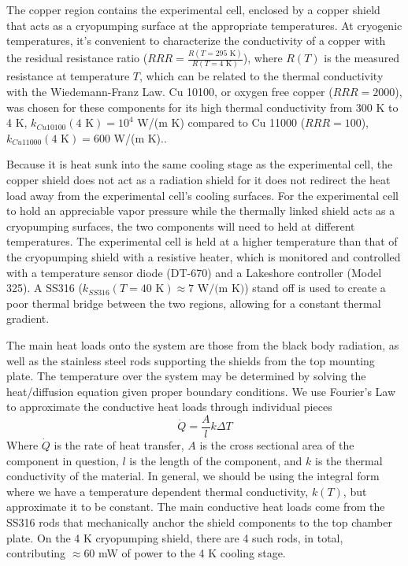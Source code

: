 The copper region contains the experimental cell, enclosed by a copper shield that acts as a cryopumping surface at the appropriate temperatures. At cryogenic temperatures, it's convenient to characterize the conductivity of a copper with the residual resistance ratio ($RRR=\frac{R(T=295\text{ K})}{R(T=4\text{ K})}$), where $R(T)$ is the measured resistance at temperature $T$, which can be related to the thermal conductivity with the Wiedemann-Franz Law.\cite{White2009} Cu 10100, or oxygen free copper ($RRR=2000$), was chosen for these components for its high thermal conductivity from 300 K to 4 K, $k_{Cu10100}(4\text{ K}) = 10^4$ W/(m K) compared to Cu 11000 ($RRR=100$), $k_{Cu11000}(4\text{ K}) = 600$ W/(m K).\cite{Simon1991}.

Because it is heat sunk into the same cooling stage as the experimental cell, the copper shield does not act as a radiation shield for it does not redirect the heat load away from the experimental cell's cooling surfaces. For the experimental cell to hold an appreciable vapor pressure while the thermally linked shield acts as a cryopumping surfaces, the two components will need to held at different temperatures. The experimental cell is held at a higher temperature than that of the cryopumping shield with a resistive heater, which is monitored and controlled with a temperature sensor diode (DT-670) and a Lakeshore controller (Model 325). A SS316 ($k_{SS316}(T=40\text{ K}) \approx 7\text{ W/(m K)}$) stand off is used to create a poor thermal bridge between the two regions, allowing for a constant thermal gradient.

The main heat loads onto the system are those from the black body radiation, as well as the stainless steel rods supporting the shields from the top mounting plate. The temperature over the system may be determined by solving the heat/diffusion equation given proper boundary conditions. We use Fourier's Law to approximate the conductive heat loads through individual pieces
\begin{equation}
	\dot{Q} = \frac{A}{l}k\Delta T
	\label{eq: fourier law}
\end{equation}
Where $\dot{Q}$ is the rate of heat transfer, $A$ is the cross sectional area of the component in question, $l$ is the length of the component, and $k$ is the thermal conductivity of the material. In general, we should be using the integral form where we have a temperature dependent thermal conductivity, $k(T)$, but approximate it to be constant. The main conductive heat loads come from the SS316 rods that mechanically anchor the shield components to the top chamber plate. On the 4 K cryopumping shield, there are 4 such rods, in total, contributing $\approx 60$ mW of power to the 4 K cooling stage.

